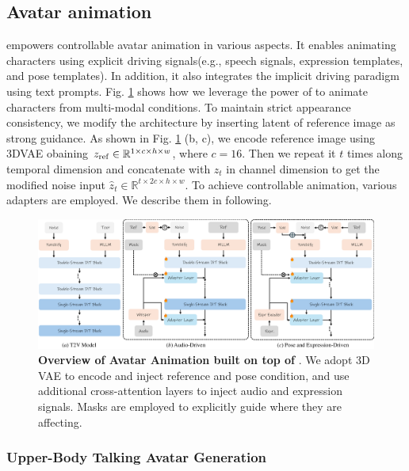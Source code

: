 \subsection{Avatar animation}

{\nameofmethod} empowers controllable avatar animation in various aspects. It enables animating characters using explicit driving signals(e.g., speech signals, expression templates, and pose templates). In addition, it also integrates the implicit driving paradigm using text prompts. Fig. \ref{fig:application-method} shows how we leverage the power of {\nameofmethod} to animate characters from multi-modal conditions. To maintain strict appearance consistency, we modify the {\nameofmethod} architecture by inserting latent of reference image as strong guidance. As shown in Fig. \ref{fig:application-method} (b, c), we encode reference image using 3DVAE obaining $z_{\rm ref} \in \mathbb{R}^{1 \times c \times h \times w}$, where $c = 16$. Then we repeat it $t$ times along temporal dimension and concatenate with $z_t$ in channel dimension to get the modified noise input $\hat{z}_t \in \mathbb{R}^{t \times 2c \times h \times w}$. To achieve controllable animation, various adapters are employed. We describe them in following.

\begin{figure}[h]
    \centering
    \includegraphics[width=\linewidth]{applications/app_figures/method.pdf}
    \caption{\textbf{Overview of Avatar Animation built on top of \nameofmethod}. We adopt 3D VAE to encode and inject reference and pose condition, and use additional cross-attention layers to inject audio and expression signals. Masks are employed to explicitly guide where they are affecting.}
    \label{fig:application-method}
\end{figure}

\subsubsection{Upper-Body Talking Avatar Generation}

